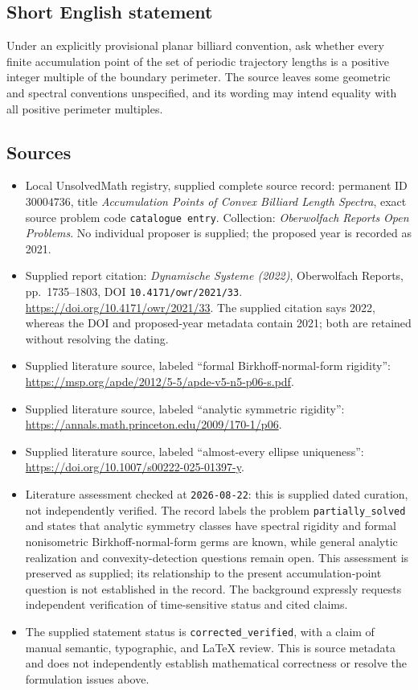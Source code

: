 \documentclass[11pt]{article}
\begin{document}
\subsection{Short English statement}
Under an explicitly provisional planar billiard convention, ask whether every finite accumulation point of the set of periodic trajectory lengths is a positive integer multiple of the boundary perimeter. The source leaves some geometric and spectral conventions unspecified, and its wording may intend equality with all positive perimeter multiples.
\subsection{Sources}
\begin{itemize}
\item Local UnsolvedMath registry, supplied complete source record: permanent ID \(30004736\), title \emph{Accumulation Points of Convex Billiard Length Spectra}, exact source problem code \texttt{catalogue entry}. Collection: \emph{Oberwolfach Reports Open Problems}. No individual proposer is supplied; the proposed year is recorded as 2021.
\item Supplied report citation: \emph{Dynamische Systeme (2022)}, Oberwolfach Reports, pp.~1735--1803, DOI \texttt{10.4171/owr/2021/33}. \url{https://doi.org/10.4171/owr/2021/33}. The supplied citation says 2022, whereas the DOI and proposed-year metadata contain 2021; both are retained without resolving the dating.
\item Supplied literature source, labeled ``formal Birkhoff-normal-form rigidity'': \url{https://msp.org/apde/2012/5-5/apde-v5-n5-p06-s.pdf}.
\item Supplied literature source, labeled ``analytic symmetric rigidity'': \url{https://annals.math.princeton.edu/2009/170-1/p06}.
\item Supplied literature source, labeled ``almost-every ellipse uniqueness'': \url{https://doi.org/10.1007/s00222-025-01397-y}.
\item Literature assessment checked at \texttt{2026-08-22}: this is supplied dated curation, not independently verified. The record labels the problem \texttt{partially\_solved} and states that analytic symmetry classes have spectral rigidity and formal nonisometric Birkhoff-normal-form germs are known, while general analytic realization and convexity-detection questions remain open. This assessment is preserved as supplied; its relationship to the present accumulation-point question is not established in the record. The background expressly requests independent verification of time-sensitive status and cited claims.
\item The supplied statement status is \texttt{corrected\_verified}, with a claim of manual semantic, typographic, and LaTeX review. This is source metadata and does not independently establish mathematical correctness or resolve the formulation issues above.
\end{itemize}
\end{document}
